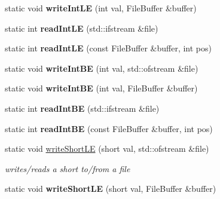 \begin{DoxyCompactItemize}
\mbox{\label{classnta_1_1IOManager_a83cc5430e709fddd4db99c563078f257}} 
static void {\bfseries write\+Int\+LE} (int val, File\+Buffer \&buffer)
\item 
\mbox{\label{classnta_1_1IOManager_ac28bb1e7b2643c99635939be2db5d35e}} 
static int {\bfseries read\+Int\+LE} (std\+::ifstream \&file)
\item 
\mbox{\label{classnta_1_1IOManager_abc104299f21748dc3e58be173ded744a}} 
static int {\bfseries read\+Int\+LE} (const File\+Buffer \&buffer, int pos)
\item 
\mbox{\label{classnta_1_1IOManager_a18ec253cf29a9457b00f227b8d380a24}} 
static void {\bfseries write\+Int\+BE} (int val, std\+::ofstream \&file)
\item 
\mbox{\label{classnta_1_1IOManager_ac6f46b1b1043bd7fa0cfc9c0c9e5aeee}} 
static void {\bfseries write\+Int\+BE} (int val, File\+Buffer \&buffer)
\item 
\mbox{\label{classnta_1_1IOManager_af56979a1069b35d72c69649a13eadef1}} 
static int {\bfseries read\+Int\+BE} (std\+::ifstream \&file)
\item 
\mbox{\label{classnta_1_1IOManager_a0a12d9ea5f6b1e4f242ca87301650445}} 
static int {\bfseries read\+Int\+BE} (const File\+Buffer \&buffer, int pos)
\item 
\mbox{\label{classnta_1_1IOManager_aa9d8d060c137fddc3880ce7dae7f23bf}} 
static void \hyperlink{classnta_1_1IOManager_aa9d8d060c137fddc3880ce7dae7f23bf}{write\+Short\+LE} (short val, std\+::ofstream \&file)
\begin{DoxyCompactList}\small\item\em writes/reads a short to/from a file \end{DoxyCompactList}\item 
\mbox{\label{classnta_1_1IOManager_af82bd388b442f6a000a77db9db1a0531}} 
static void {\bfseries write\+Short\+LE} (short val, File\+Buffer \&buffer)
\item 

\end{DoxyCompactItemize}
